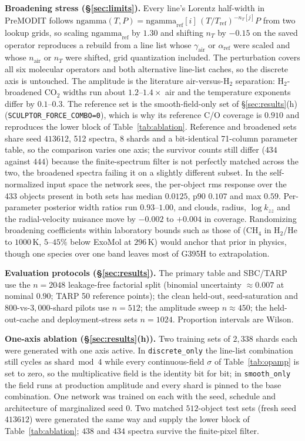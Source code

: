 \documentclass{article}
\begin{document}
\textbf{Broadening stress (\S\ref{sec:limits}).} Every line's Lorentz half-width
in PreMODIT follows
$\mathrm{ngamma}(T,P)=\mathrm{ngamma}_{\mathrm{ref}}[i]\,
(T/T_{\mathrm{ref}})^{-n_{T}[j]}P$ from two lookup grids, so scaling
$\mathrm{ngamma}_{\mathrm{ref}}$ by $1.30$ and shifting $n_{T}$ by $-0.15$ on
the saved operator reproduces a rebuild from a line list whose
$\gamma_{\mathrm{air}}$ or $\alpha_{\mathrm{ref}}$ were scaled and whose
$n_{\mathrm{air}}$ or $n_{T}$ were shifted, grid quantization included. The perturbation covers all
six molecular operators and both alternative line-list caches, so the discrete
axis is untouched. The amplitude is the literature air-versus-H$_2$ separation:
H$_2$-broadened CO$_2$ widths run about $1.2$--$1.4\times$ air and the
temperature exponents differ by $0.1$--$0.3$. The reference set is the
smooth-field-only set of \S\ref{sec:results}(h)
(\texttt{SCULPTOR\_FORCE\_COMBO=0}), which is why its reference C/O coverage is
$0.910$ and reproduces the lower block of Table~\ref{tab:ablation}. Reference
and broadened sets share seed $413612$, 512 spectra, 8 shards and a
bit-identical 71-column parameter table, so the comparison varies one axis; the
survivor counts still differ ($434$ against $444$) because the finite-spectrum
filter is not perfectly matched across the two, the broadened spectra failing it
on a slightly different subset. In the self-normalized input space the
network sees, the per-object rms response over the 433 objects present in both
sets has median $0.0125$, p90 $0.107$ and max $0.59$. Per-parameter posterior width ratios run $0.93$--$1.00$, and clouds, radius,
$\log k_{zz}$ and the radial-velocity nuisance move by $-0.002$ to $+0.004$ in
coverage. Randomizing broadening coefficients within laboratory bounds such as
those of \citet{hosokawa2025} (CH$_4$ in H$_2$/He to $1000$\,K, $5$--$45\%$
below ExoMol at $296$\,K) would anchor that prior in physics, though one
species over one band leaves most of G395H to extrapolation.

\textbf{Evaluation protocols (\S\ref{sec:results}).} The primary table and
SBC/TARP use the $n=2048$ leakage-free factorial split (binomial uncertainty
$\approx0.007$ at nominal $0.90$; TARP 50 reference points); the clean held-out,
seed-saturation and $800$-vs-$3{,}000$-shard pilots use $n=512$; the amplitude
sweep $n\!\approx\!450$; the held-out-cache and deployment-stress sets $n=1024$.
Proportion intervals are Wilson.

\textbf{One-axis ablation (\S\ref{sec:results}(h)).} Two training sets of
$2{,}338$ shards each were generated with one axis active. In
\texttt{discrete\_only} the line-list combination still cycles as
$\mathrm{shard}\bmod4$ while every continuous-field $\sigma$ of
Table~\ref{tab:opamp} is set to zero, so the multiplicative field is the identity
bit for bit; in \texttt{smooth\_only} the field runs at production amplitude and
every shard is pinned to the base combination. One network was trained on each
with the seed, schedule and architecture of marginalized seed 0. Two matched
$512$-object test sets (fresh seed $413612$) were generated the same way and
supply the lower block of Table~\ref{tab:ablation}; $438$ and $434$ spectra
survive the finite-pixel filter.
\end{document}
